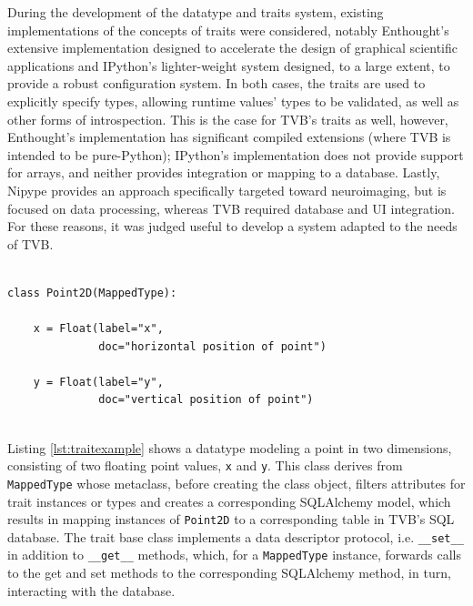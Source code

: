\documentclass{bioinfo}
\begin{document}
During the development of the datatype and traits system, existing implementations
of the concepts of traits were considered, notably Enthought's extensive 
implementation designed to accelerate the design of graphical scientific 
applications and IPython's lighter-weight system designed, to a large extent, 
to provide a robust configuration system. In both cases, the traits are used
to explicitly specify types, allowing runtime values' types to be validated, 
as well as other forms of introspection. This is the case for TVB's traits 
as well, however, Enthought's implementation has significant compiled extensions
(where TVB is intended to be pure-Python); IPython's implementation does not
provide support for arrays, and neither provides integration or mapping to a
database. Lastly, Nipype \citep{gorgolewski2011nipype} provides an approach
specifically targeted toward neuroimaging, but is focused on data processing, 
whereas TVB required database and UI integration.
For these reasons, it was judged useful to develop a system adapted 
to the needs of TVB. 

\begin{lstlisting}[caption={Example of a simple datatype modeling a point in two dimensions}, 
		   label={lst:traitexample}]

class Point2D(MappedType):

    x = Float(label="x",
              doc="horizontal position of point")

    y = Float(label="y",
              doc="vertical position of point")
	      
\end{lstlisting}

Listing \ref{lst:traitexample} shows a datatype modeling a point in two 
dimensions, consisting of two floating point values, \texttt{x} and 
\texttt{y}. This class derives from \texttt{MappedType} whose metaclass, 
before creating the class object, filters attributes for trait instances 
or types and creates a corresponding SQLAlchemy model, which results 
in mapping instances of \texttt{Point2D} to a corresponding table in TVB's
SQL database. The trait base class implements a data descriptor protocol,
i.e. \texttt{\_\_set\_\_} in addition to \texttt{\_\_get\_\_} methods, which, for a
\texttt{MappedType} instance, forwards calls to the get and set methods to 
the corresponding SQLAlchemy method, in turn, interacting with the database.
\end{document}
